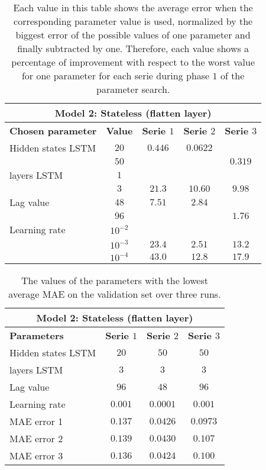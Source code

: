 \begin{table}[h]
	\centering
	\begin{tabular}{@{}l||c|ccc@{}} \toprule
		\multicolumn{5}{c}{Model 2: Stateless (flatten layer)}\\\midrule\midrule
		\textbf{Chosen parameter}	& \textbf{Value} & \textbf{Serie $ 1 $} & \textbf{Serie $ 2 $} & \textbf{Serie $ 3 $}\\\midrule
		Hidden states LSTM & $ 20 $ & $0.446 $&$ 0.0622 $  & \\
		& $ 50 $  & 		  		&		   				& $0.319 $		\\\hline
		layers LSTM & $ 1 $ & 		&		   & 		\\
		& $ 3 $ &  $21.3 $   	&$ 10.60 $  				& $9.98$\\\hline
		Lag value & $ 48 $ & $7.51 $&$ 2.84 $		   & \\
		& $ 96 $ &          		& 		 & 	$1.76$	\\\hline
		Learning rate & $ 10^{-2} $ &       &		 & 		\\
		& $  10^{-3} $ &$23.4 $    &$ 2.51$  			& $13.2$\\
		& $  10^{-4} $ &$43.0 $		&$ 12.8$    	& $17.9$\\\bottomrule
		
	\end{tabular}
	\caption{Each value in this table shows the average error when the corresponding parameter value is used, normalized by the biggest error of the possible values of one parameter and finally subtracted by one. Therefore, each value shows a percentage of improvement with respect to the worst value for one parameter for each serie during phase $ 1 $ of the parameter search.}
	\label{tab:relative_performance_parameters_phase_one_model_two}
\end{table}

\begin{table}[h]
	\centering
	\begin{tabular}{@{}l|ccc@{}} \toprule
		\multicolumn{4}{c}{Model 2: Stateless (flatten layer)}\\\midrule\midrule
		\textbf{Parameters}	& \textbf{Serie $ 1 $} & \textbf{Serie $ 2 $} & \textbf{Serie $ 3 $}\\\midrule
		Hidden states LSTM & $20 $&$ 50 $  & $50 $\\
		layers LSTM & $3 $&$ 3 $  & $3$\\
		Lag value & $96 $&$ 48$  & $96$\\
		Learning rate & $0.001 $&$ 0.0001$  & $0.001$\\\hline
		MAE error 1   & $ 0.137 $ & $ 0.0426 $ & $ 0.0973 $\\
		MAE error 2   & $ 0.139 $ & $ 0.0430 $ & $ 0.107 $\\
		MAE error 3   & $ 0.136 $ & $ 0.0424 $ & $ 0.100 $\\\bottomrule
	\end{tabular}
	\caption{The values of the parameters with the lowest average MAE on the validation set over three runs.}
	\label{tab:best_performing_para_phase1_model2}
\end{table}


